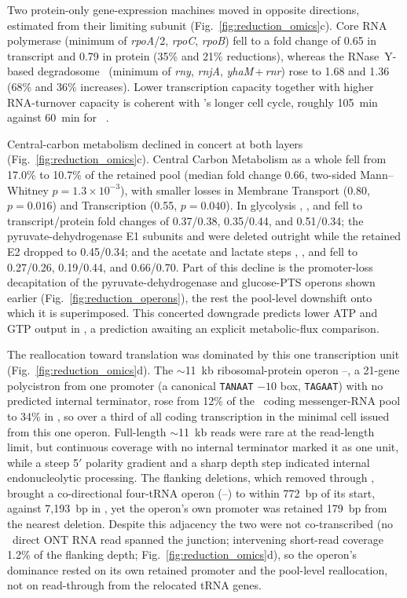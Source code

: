 Two protein-only gene-expression machines moved in opposite directions, estimated from their limiting subunit (Fig.~\ref{fig:reduction_omics}c).
Core RNA polymerase (minimum of \textit{rpoA}/2, \textit{rpoC}, \textit{rpoB}) fell to a fold change of 0.65 in transcript and 0.79 in protein (35\% and 21\% reductions), whereas the RNase~Y-based degradosome~\cite{redko_minimal_2013} (minimum of \textit{rny}, \textit{rnjA}, \textit{yhaM}\,+\,\textit{rnr}) rose to 1.68 and 1.36 (68\% and 36\% increases).
Lower transcription capacity together with higher RNA-turnover capacity is coherent with \syna's longer cell cycle, roughly 105~min against 60~min for \syn~\cite{pelletier_genetic_2021}.

Central-carbon metabolism declined in concert at both layers (Fig.~\ref{fig:reduction_omics}c).
Central Carbon Metabolism as a whole fell from 17.0\% to 10.7\% of the retained pool (median fold change 0.66, two-sided Mann--Whitney $p = 1.3\times10^{-3}$), with smaller losses in Membrane Transport (0.80, $p = 0.016$) and Transcription (0.55, $p = 0.040$).
In glycolysis , , and  fell to transcript/protein fold changes of 0.37/0.38, 0.35/0.44, and 0.51/0.34; the pyruvate-dehydrogenase E1 subunits  and  were deleted outright while the retained E2  dropped to 0.45/0.34; and the acetate and lactate steps , , and  fell to 0.27/0.26, 0.19/0.44, and 0.66/0.70.
Part of this decline is the promoter-loss decapitation of the pyruvate-dehydrogenase and glucose-PTS operons shown earlier (Fig.~\ref{fig:reduction_operons}), the rest the pool-level downshift onto which it is superimposed.
This concerted downgrade predicts lower ATP and GTP output in \syna, a prediction awaiting an explicit metabolic-flux comparison.

The reallocation toward translation was dominated by this one transcription unit (Fig.~\ref{fig:reduction_omics}d).
The $\sim$11~kb ribosomal-protein operon --, a 21-gene polycistron from one promoter (a canonical \texttt{TANAAT} $-10$ box, \texttt{TAGAAT}) with no predicted internal terminator, rose from 12\% of the \syn~coding messenger-RNA pool to 34\% in \syna, so over a third of all coding transcription in the minimal cell issued from this one operon.
Full-length $\sim$11~kb reads were rare at the read-length limit, but continuous coverage with no internal terminator marked it as one unit, while a steep 5$'$ polarity gradient and a sharp depth step indicated internal endonucleolytic processing.
The flanking deletions, which removed  through , brought a co-directional four-tRNA operon (--) to within 772~bp of its start, against 7{,}193~bp in \syn, yet the operon's own promoter was retained 179~bp from the nearest deletion.
Despite this adjacency the two were not co-transcribed (no \syna~direct ONT RNA read spanned the junction; intervening short-read coverage 1.2\% of the flanking depth; Fig.~\ref{fig:reduction_omics}d), so the operon's dominance rested on its own retained promoter and the pool-level reallocation, not on read-through from the relocated tRNA genes.

